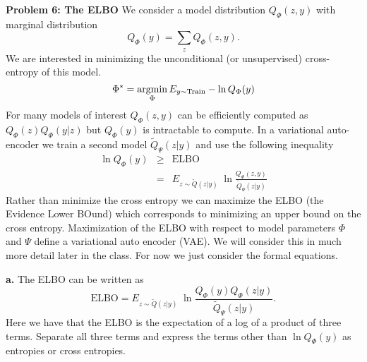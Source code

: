 \documentclass{article}
\newcommand{\solution}[1]{}
\begin{document}
\solution{
  We first note that for discrete distributions where $z$ is a function of $y$ we have $P(x|y,z) = P(x|y)$ which implies that $H(x|y,z) = H(x|y)$.  so the above inequality can be written as
  $$H(x|z) \geq H(x|y).$$
  The result then follows from
  $$I(x,z) = H(x) - H(x|z)$$
  and
  $$I(x,y) = H(x) - H(x|y)$$
}

\bigskip
{\bf Problem 6: The ELBO}
We consider a model distribution $Q_\Phi(z,y)$ with marginal distribution
$$Q_\Phi(y) = \sum_z Q_\Phi(z,y).$$
We are interested in minimizing the unconditional (or unsupervised) cross-entropy of this model.
$$\Phi^* = \operatorname*{argmin}_\Phi E_{y \sim \mathrm{Train}} - \ln Q_\Phi(y)$$
For many models of interest $Q_\Phi(z,y)$ can be efficiently computed as $Q_\Phi(z)Q_\Phi(y|z)$ but $Q_\Phi(y)$ is intractable to compute.
In a variational auto-encoder we train a second model $\tilde{Q}_\Psi(z|y)$ and use the following inequality
\begin{eqnarray*}
\ln Q_\Phi(y) & \geq & \mathrm{ELBO}\\
& = & E_{z \sim \tilde{Q}(z|y)} \;\ln \frac{Q_\Phi(z,y)}{\tilde{Q}_\Psi(z|y)}
\end{eqnarray*}
Rather than minimize the cross entropy we can maximize the ELBO (the Evidence Lower BOund) which corresponds to minimizing an upper bound on the cross entropy.
Maximization of the ELBO with respect to model parameters $\Phi$ and $\Psi$ define a variational auto encoder (VAE).
We will consider this in much more detail later in the class.  For now we just consider the formal equations.

\bigskip
{\bf a.} The ELBO can be written as
$$\mathrm{ELBO} = E_{z \sim \tilde{Q}(z|y)} \;\ln \frac{Q_\Phi(y)Q_\Phi(z|y)}{\tilde{Q}_\Psi(z|y)}.$$
Here we have that the ELBO is the expectation of a log of a product of three terms. Separate all three terms and express
the terms other than $\ln Q_\Phi(y)$ as entropies or cross entropies.

\solution{
  \begin{eqnarray*}
    ELBO & = & E_{z \sim \tilde{Q}_\Psi(z|y)}\;\ln \frac{Q_\Phi(y)Q_\Phi(z|y)}{\tilde{Q}_\Psi(z|y)} \\
    \\
    & = & \left(E_{z \sim \tilde{Q}_\Psi(z|y)}\;\ln Q_\Phi(y)\right) +
    \left(E_{z \sim \tilde{Q}_\Psi(z|y)}\;\ln Q_\Phi(z|y)\right)
    + \left(E_{z \sim \tilde{Q}_\Psi(z|y)}\;\ln \frac{1}{\tilde{Q}_\Psi(z|y)}\right) \\
    & = & \ln Q_\Phi(y) - H(\tilde{Q}_\Psi(z|y),Q_\Phi(z|y)) +  H(\tilde{Q}(z|y))
  \end{eqnarray*}
}
\end{document}
